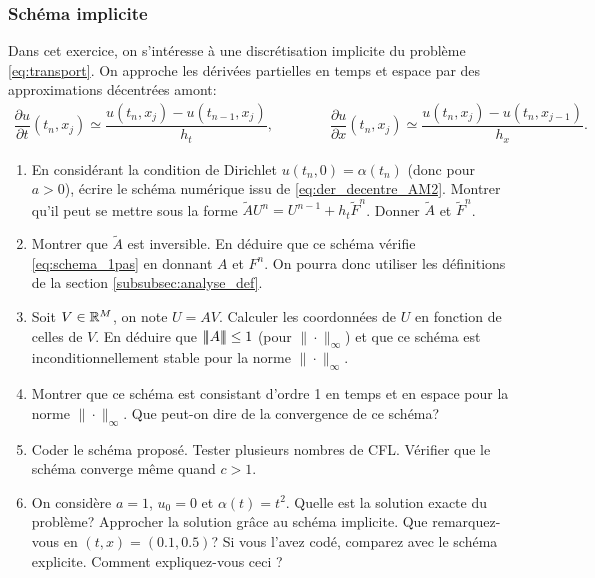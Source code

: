 \documentclass[12pt,a4paper,twoside]{article}
\begin{document}
\subsubsection{Sch\'ema implicite}



\begin{exercise}
  \label{exo:transport_implicite}
  Dans cet exercice, on s'int\'eresse \`a une discr\'etisation implicite du probl\`eme
  \eqref{eq:transport}.
  On approche les d\'eriv\'ees partielles en temps et espace
  par des approximations d\'ecentr\'ees amont:
  \begin{align}
    \label{eq:der_decentre_AM2}
    \dfrac{\partial u}{\partial t}(t_n,x_j) \simeq \dfrac{u(t_{n},x_j) - u(t_{n-1},x_j)}{h_t} ,
    \qquad \qquad 
    \dfrac{\partial u}{\partial x}(t_n,x_j) \simeq \dfrac{u(t_n,x_{j}) - u(t_n,x_{j-1})}{h_x} .
  \end{align}
  
  \begin{enumerate}
  \item En consid\'erant la condition de Dirichlet $u(t_n,0) = \alpha(t_n)$ (donc pour $a>0$), 
    \'ecrire le sch\'ema num\'erique issu de \eqref{eq:der_decentre_AM2}.
    Montrer qu'il peut se mettre sous la forme $\widetilde{A} U^{n} = U^{n-1} + h_t \widetilde{F}^n$.
    Donner $\widetilde{A}$ et $\widetilde{F}^n$.
  \item Montrer que $\widetilde{A}$ est inversible. En d\'eduire que ce sch\'ema v\'erifie
    \eqref{eq:schema_1pas} en donnant $A$ et $F^n$.
    On pourra donc utiliser les d\'efinitions de la section \ref{subsubsec:analyse_def}.
  \item Soit $V \in \mathbb{R}^M$, on note $U = A V$. 
    Calculer les coordonn\'ees de $U$ en fonction de celles de $V$.
    En d\'eduire que $|\!|\!| A |\!|\!| \leq 1$ (pour $\| \cdot \|_{\infty}$) et que
    ce sch\'ema est inconditionnellement stable pour la norme $\| \cdot \|_{\infty}$.
    
  \item Montrer que ce sch\'ema est consistant d'ordre 1 en temps et en espace
    pour la norme $\| \cdot \|_{\infty}$.
    Que peut-on dire de la convergence de ce sch\'ema?

  \item Coder le sch\'ema propos\'e.
    Tester plusieurs nombres de CFL.
    V\'erifier que le sch\'ema converge m\^eme quand $c > 1$.


  \item On consid\`ere $a=1$, $u_0 = 0$ et $\alpha(t) = t^2$.
    Quelle est la solution exacte du probl\`eme?
    Approcher la solution gr\^ace au sch\'ema implicite.
    Que remarquez-vous en $(t,x)=(0.1,0.5)$?
    Si vous l'avez cod\'e, comparez avec le sch\'ema explicite.
    Comment expliquez-vous ceci ?
    

\end{enumerate}
\end{exercise}
\end{document}
